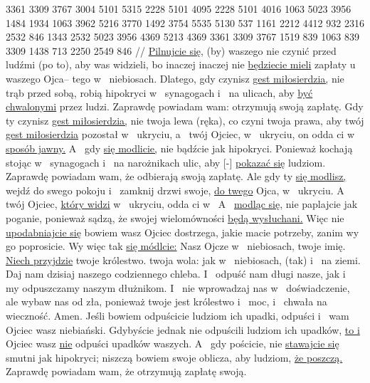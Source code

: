 {} 3361 3309 3767 3004 5101 5315 2228 5101 4095 2228 5101 4016
{} 1063 5023 3956 1484 1934 1063 3962 5216 3770 1492 3754 5535 5130 537
{} 1161 2212 4412 932 2316 2532 846 1343 2532 5023 3956 4369 5213 4369
{} 3361 3309 3767 1519 839 1063 839 3309 1438 713 {} 2250 2549 846
//
\glb
 \underline{Pilnujcie się,} (by) waszego  nie czynić przed ludźmi (po to), aby was widzieli, bo inaczej inaczej nie \underline{będziecie mieli} zapłaty u~ waszego Ojca– tego w~ niebiosach.
 Dlatego, gdy czynisz \underline{gest miłosierdzia,} nie trąb przed sobą,  robią hipokryci w~ synagogach i~ na ulicach, aby \underline{być chwalonymi} przez ludzi. Zaprawdę powiadam wam: otrzymują swoją zapłatę.
 Gdy ty czynisz \underline{gest miłosierdzia,}  nie  twoja lewa (ręka), co czyni twoja prawa,
 aby twój \underline{gest miłosierdzia} pozostał w~ ukryciu, a~ twój Ojciec,  w~ ukryciu, on odda ci w~ \underline{sposób jawny.}
 A~ gdy \underline{się modlicie,} nie bądźcie jak hipokryci. Ponieważ kochają  stojąc w~ synagogach i~ na narożnikach ulic, aby [-] \underline{pokazać się} ludziom. Zaprawdę powiadam wam, że odbierają swoją zapłatę.
 Ale gdy ty \underline{się modlisz,} wejdź do swego pokoju i~ zamknij drzwi swoje,  \underline{do twego} Ojca,  w~ ukryciu. A~ twój Ojciec, \underline{który widzi} w~ ukryciu, odda ci w~ 
 A~ \underline{modląc się,} nie paplajcie jak poganie, ponieważ sądzą, że  swojej wielomówności \underline{będą wysłuchani.}
 Więc nie \underline{upodabniajcie się}  bowiem wasz Ojciec dostrzega, jakie macie potrzeby, zanim wy go poprosicie.
 Wy więc tak \underline{się módlcie:} Nasz Ojcze w~ niebiosach,  twoje imię.
 \underline{Niech przyjdzie} twoje królestwo.  twoja wola: jak w~ niebiosach, (tak) i~ na ziemi.
 Daj nam dzisiaj naszego codziennego chleba.
 I~ odpuść nam długi nasze, jak i~ my odpuszczamy naszym dłużnikom.
 I~ nie wprowadzaj nas w~ doświadczenie, ale wybaw nas od zła, ponieważ twoje jest królestwo i~ moc, i~ chwała na wieczność. Amen.
 Jeśli bowiem odpuścicie ludziom ich upadki, odpuści i~ wam Ojciec wasz niebiański.
 Gdybyście jednak nie odpuścili ludziom ich upadków, \underline{to i} Ojciec wasz \underline{nie} odpuści upadków waszych.
 A~ gdy pościcie, nie \underline{stawajcie się} smutni jak hipokryci; niszczą bowiem swoje oblicza, aby  ludziom, \underline{że poszczą.} Zaprawdę powiadam wam, że otrzymują zapłatę swoją.
